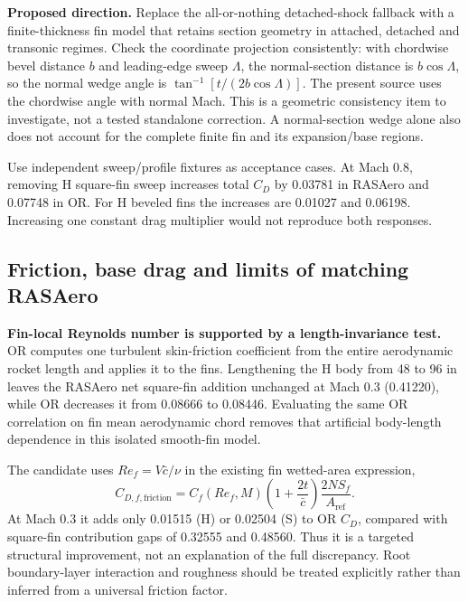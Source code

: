 \documentclass[oneside,openany]{amsdtx}
\begin{document}
\textbf{Proposed direction.} Replace the all-or-nothing detached-shock fallback with a finite-thickness fin model that retains section geometry in attached, detached and transonic regimes. Check the coordinate projection consistently: with chordwise bevel distance $b$ and leading-edge sweep $\Lambda$, the normal-section distance is $b\cos\Lambda$, so the normal wedge angle is $\tan^{-1}[t/(2b\cos\Lambda)]$. The present source uses the chordwise angle with normal Mach. This is a geometric consistency item to investigate, not a tested standalone correction. A normal-section wedge alone also does not account for the complete finite fin and its expansion/base regions.

Use independent sweep/profile fixtures as acceptance cases. At Mach 0.8, removing H square-fin sweep increases total $C_D$ by 0.03781 in RASAero and 0.07748 in OR. For H beveled fins the increases are 0.01027 and 0.06198. Increasing one constant drag multiplier would not reproduce both responses.



\clearpage\subsection{Friction, base drag and limits of matching RASAero}
\textbf{Fin-local Reynolds number is supported by a length-invariance test.} OR computes one turbulent skin-friction coefficient from the entire aerodynamic rocket length and applies it to the fins. Lengthening the H body from 48 to 96 in leaves the RASAero net square-fin addition unchanged at Mach 0.3 (0.41220), while OR decreases it from 0.08666 to 0.08446. Evaluating the same OR correlation on fin mean aerodynamic chord removes that artificial body-length dependence in this isolated smooth-fin model.

The candidate uses $Re_f=V\bar c/\nu$ in the existing fin wetted-area expression,
\begin{equation}
 C_{D,f,\mathrm{friction}}=C_f(Re_f,M)\left(1+\frac{2t}{\bar c}\right)\frac{2NS_f}{A_{\mathrm{ref}}}.
\end{equation}
At Mach 0.3 it adds only 0.01515 (H) or 0.02504 (S) to OR $C_D$, compared with square-fin contribution gaps of 0.32555 and 0.48560. Thus it is a targeted structural improvement, not an explanation of the full discrepancy. Root boundary-layer interaction and roughness should be treated explicitly rather than inferred from a universal friction factor.
\end{document}
